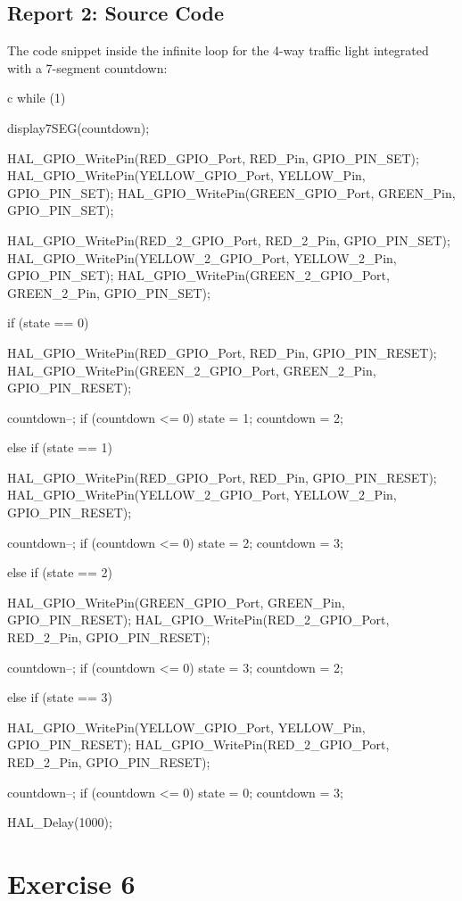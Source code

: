 \documentclass{hcmut-report}
\begin{document}
\subsection*{Report 2: Source Code}
The code snippet inside the infinite loop for the 4-way traffic light integrated with a 7-segment countdown:

\begin{code}{c}
  while (1)
  {
      display7SEG(countdown);

      HAL_GPIO_WritePin(RED_GPIO_Port, RED_Pin, GPIO_PIN_SET);
      HAL_GPIO_WritePin(YELLOW_GPIO_Port, YELLOW_Pin, GPIO_PIN_SET);
      HAL_GPIO_WritePin(GREEN_GPIO_Port, GREEN_Pin, GPIO_PIN_SET);

      HAL_GPIO_WritePin(RED_2_GPIO_Port, RED_2_Pin, GPIO_PIN_SET);
      HAL_GPIO_WritePin(YELLOW_2_GPIO_Port, YELLOW_2_Pin, GPIO_PIN_SET);
      HAL_GPIO_WritePin(GREEN_2_GPIO_Port, GREEN_2_Pin, GPIO_PIN_SET);

      if (state == 0) {
          HAL_GPIO_WritePin(RED_GPIO_Port, RED_Pin, GPIO_PIN_RESET);
          HAL_GPIO_WritePin(GREEN_2_GPIO_Port, GREEN_2_Pin, GPIO_PIN_RESET);

          countdown--;
          if (countdown <= 0) {
              state = 1;
              countdown = 2; 
          }
      }
      else if (state == 1) {
          HAL_GPIO_WritePin(RED_GPIO_Port, RED_Pin, GPIO_PIN_RESET);
          HAL_GPIO_WritePin(YELLOW_2_GPIO_Port, YELLOW_2_Pin, GPIO_PIN_RESET);

          countdown--;
          if (countdown <= 0) {
              state = 2;
              countdown = 3; 
          }
      }
      else if (state == 2) {
          HAL_GPIO_WritePin(GREEN_GPIO_Port, GREEN_Pin, GPIO_PIN_RESET);
          HAL_GPIO_WritePin(RED_2_GPIO_Port, RED_2_Pin, GPIO_PIN_RESET);

          countdown--;
          if (countdown <= 0) {
              state = 3;
              countdown = 2; 
          }
      }
      else if (state == 3) {
          HAL_GPIO_WritePin(YELLOW_GPIO_Port, YELLOW_Pin, GPIO_PIN_RESET);
          HAL_GPIO_WritePin(RED_2_GPIO_Port, RED_2_Pin, GPIO_PIN_RESET);

          countdown--;
          if (countdown <= 0) {
              state = 0;
              countdown = 3; 
          }
      }

      HAL_Delay(1000); 
  }
\end{code}

\section{Exercise 6}
\end{document}
